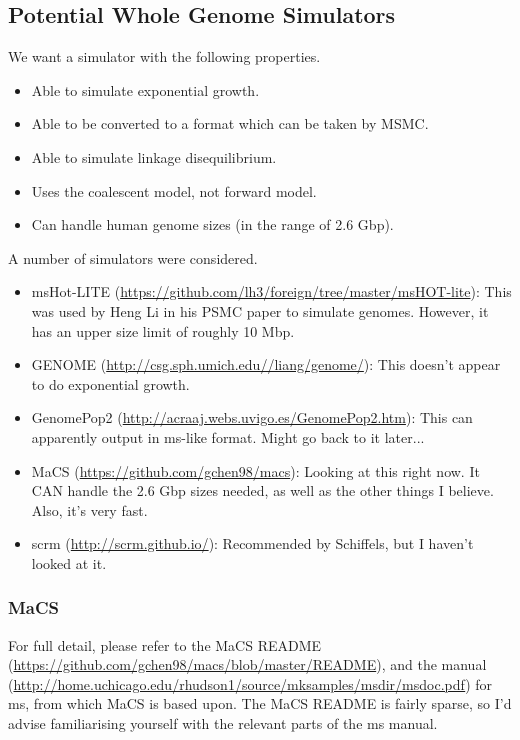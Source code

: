 \documentclass[11pt,a4paper]{article}
\begin{document}


\subsection{Potential Whole Genome Simulators}
We want a simulator with the following properties.
\begin{itemize}
\item Able to simulate exponential growth.
\item Able to be converted to a format which can be taken by MSMC.
\item Able to simulate linkage disequilibrium.
\item Uses the coalescent model, not forward model.
\item Can handle human genome sizes (in the range of 2.6 Gbp).
\end{itemize}
A number of simulators were considered.
\begin{itemize}
\item msHot-LITE (\url{https://github.com/lh3/foreign/tree/master/msHOT-lite}): This was used by Heng Li in his PSMC paper to simulate genomes. However, it has an upper size limit of roughly 10 Mbp.
\item GENOME (\url{http://csg.sph.umich.edu//liang/genome/}): This doesn't appear to do exponential growth.
\item GenomePop2 (\url{http://acraaj.webs.uvigo.es/GenomePop2.htm}): This can apparently output in ms-like format. Might go back to it later...
\item MaCS (\url{https://github.com/gchen98/macs}): Looking at this right now. It CAN handle the 2.6 Gbp sizes needed, as well as the other things I believe. Also, it's very fast.
\item scrm (\url{http://scrm.github.io/}): Recommended by Schiffels, but I haven't looked at it.
\end{itemize}

\subsubsection{MaCS}
For full detail, please refer to the MaCS README (\url{https://github.com/gchen98/macs/blob/master/README}), and the manual (\url{http://home.uchicago.edu/rhudson1/source/mksamples/msdir/msdoc.pdf}) for ms\cite{hudson2002generating}, from which MaCS is based upon. The MaCS README is fairly sparse, so I'd advise familiarising yourself with the relevant parts of the ms manual.
\end{document}
